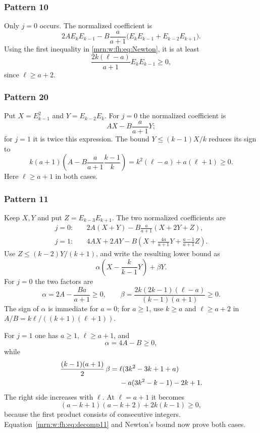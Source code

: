 \documentclass[11pt,a4paper]{article}
\theoremstyle{remark}\newtheorem{remark}[theorem]{Remark}
\begin{document}
\subsubsection{Pattern 10}
Only $j=0$ occurs. The normalized coefficient is
\[
 2A E_kE_{k-1}-B\frac a{a+1}
 \big(E_kE_{k-1}+E_{k-2}E_{k+1}\big).
\]
Using the first inequality in \eqref{mrn:w:fh:eq:Newton}, it is at least
\[
 \frac{2k(\ell-a)}{a+1}E_kE_{k-1}\ge0,
\]
since $\ell\ge a+2$.

\subsubsection{Pattern 20}
Put $X=E_{k-1}^2$ and $Y=E_{k-2}E_k$. For $j=0$ the normalized coefficient is
\[
 AX-B\frac a{a+1}Y;
\]
for $j=1$ it is twice this expression. The bound $Y\le(k-1)X/k$ reduces its sign to
\[
 k(a+1)\left(A-B\frac a{a+1}\frac{k-1}{k}\right)
 =k^2(\ell-a)+a(\ell+1)\ge0.
\]
Here $\ell\ge a+1$ in both cases.

\subsubsection{Pattern 11}
Keep $X,Y$ and put $Z=E_{k-3}E_{k+1}$. The two normalized coefficients are
\begin{align*}
 j=0:\quad&2A(X+Y)-B\frac a{a+1}(X+2Y+Z),\\
 j=1:\quad&4AX+2AY-B\left(X+\frac{4a}{a+1}Y+\frac{a-1}{a+1}Z\right).
\end{align*}
Use $Z\le(k-2)Y/(k+1)$, and write the resulting lower bound as
\begin{equation}\label{mrn:w:fh:eq:decomp11}
 \alpha\left(X-\frac{k}{k-1}Y\right)+\beta Y.
\end{equation}
For $j=0$ the two factors are
\[
 \alpha=2A-\frac{Ba}{a+1}\ge0,
 \qquad
 \beta=\frac{2k(2k-1)(\ell-a)}{(k-1)(a+1)}\ge0.
\]
The sign of $\alpha$ is immediate for $a=0$; for $a\ge1$, use $k\ge a$ and $\ell\ge a+2$ in $A/B=k\ell/((k+1)(\ell+1))$.

For $j=1$ one has $a\ge1$, $\ell\ge a+1$, and
\[
 \alpha=4A-B\ge0,
\]
while
\begin{align*}
 \frac{(k-1)(a+1)}2\,\beta
 ={}&\ell(3k^2-3k+1+a)\notag\\
 &-a(3k^2-k-1)-2k+1.
\end{align*}
The right side increases with $\ell$. At $\ell=a+1$ it becomes
\[
 (a-k+1)(a-k+2)+2k(k-1)\ge0,
\]
because the first product consists of consecutive integers. Equation~\eqref{mrn:w:fh:eq:decomp11} and Newton's bound now prove both cases.
\end{document}
